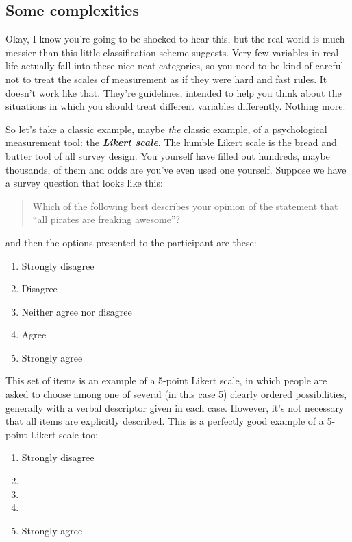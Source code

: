 \documentclass[
]{book}
\providecommand{\tightlist}{%
  \setlength{\itemsep}{0pt}\setlength{\parskip}{0pt}}
\begin{document}
\hypertarget{some-complexities}{%
\subsection{Some complexities}\label{some-complexities}}

Okay, I know you're going to be shocked to hear this, but the real world is much messier than this little classification scheme suggests. Very few variables in real life actually fall into these nice neat categories, so you need to be kind of careful not to treat the scales of measurement as if they were hard and fast rules. It doesn't work like that. They're guidelines, intended to help you think about the situations in which you should treat different variables differently. Nothing more.

So let's take a classic example, maybe \emph{the} classic example, of a psychological measurement tool: the \textbf{\emph{Likert scale}}. The humble Likert scale is the bread and butter tool of all survey design. You yourself have filled out hundreds, maybe thousands, of them and odds are you've even used one yourself. Suppose we have a survey question that looks like this:

\begin{quote}
Which of the following best describes your opinion of the statement that ``all pirates are freaking awesome''?
\end{quote}

and then the options presented to the participant are these:

\begin{enumerate}
\def\labelenumi{(\arabic{enumi})}
\tightlist
\item
  Strongly disagree
\item
  Disagree
\item
  Neither agree nor disagree
\item
  Agree
\item
  Strongly agree
\end{enumerate}

This set of items is an example of a 5-point Likert scale, in which people are asked to choose among one of several (in this case 5) clearly ordered possibilities, generally with a verbal descriptor given in each case. However, it's not necessary that all items are explicitly described. This is a perfectly good example of a 5-point Likert scale too:

\begin{enumerate}
\def\labelenumi{(\arabic{enumi})}
\tightlist
\item
  Strongly disagree
\item
\item
\item
\item
  Strongly agree
\end{enumerate}
\end{document}
